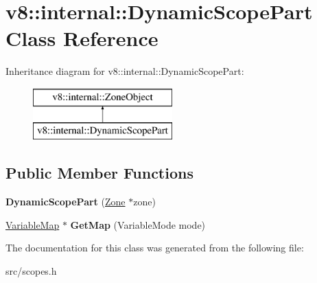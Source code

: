 \hypertarget{classv8_1_1internal_1_1_dynamic_scope_part}{}\section{v8\+:\+:internal\+:\+:Dynamic\+Scope\+Part Class Reference}
\label{classv8_1_1internal_1_1_dynamic_scope_part}
Inheritance diagram for v8\+:\+:internal\+:\+:Dynamic\+Scope\+Part\+:\begin{figure}[H]
\begin{center}
\leavevmode
\includegraphics[height=2.000000cm]{classv8_1_1internal_1_1_dynamic_scope_part}
\end{center}
\end{figure}
\subsection*{Public Member Functions}
\begin{DoxyCompactItemize}
\item 
\hypertarget{classv8_1_1internal_1_1_dynamic_scope_part_a3c5113ac321bc9169b56cb20ad8d5f13}{}{\bfseries Dynamic\+Scope\+Part} (\hyperlink{classv8_1_1internal_1_1_zone}{Zone} $\ast$zone)\label{classv8_1_1internal_1_1_dynamic_scope_part_a3c5113ac321bc9169b56cb20ad8d5f13}

\item 
\hypertarget{classv8_1_1internal_1_1_dynamic_scope_part_ac1b3bda0729b6d8e3443442557465b85}{}\hyperlink{classv8_1_1internal_1_1_variable_map}{Variable\+Map} $\ast$ {\bfseries Get\+Map} (Variable\+Mode mode)\label{classv8_1_1internal_1_1_dynamic_scope_part_ac1b3bda0729b6d8e3443442557465b85}

\end{DoxyCompactItemize}


The documentation for this class was generated from the following file\+:\begin{DoxyCompactItemize}
\item 
src/scopes.\+h\end{DoxyCompactItemize}

